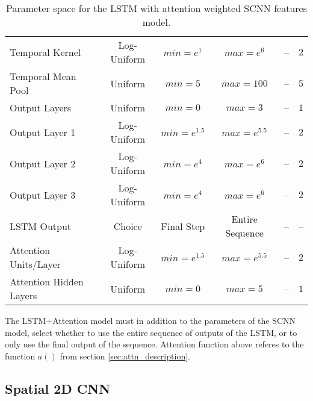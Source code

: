\begin{table}[htp]
{\begin{tabular}{ l | c | c | c | c | c }
      Temporal Kernel             &  Log-Uniform  & $min=e^{1}$   & $max=e^{6}$       &  --    & $2$         \\
      Temporal Mean Pool          &    Uniform    & $min=5$      & $max=100$         &  --    & $5$         \\
      Output Layers               &    Uniform    & $min=0$      & $max=3$           &  --    & $1$         \\
      Output Layer 1              &  Log-Uniform  & $min=e^{1.5}$ & $max=e^{5.5}$      &  --    & $2$         \\
      Output Layer 2              &  Log-Uniform  & $min=e^{4}$   & $max=e^{6}$       &  --    & $2$         \\
      Output Layer 3              &  Log-Uniform  & $min=e^{4}$   & $max=e^{6}$       &  --    & $2$         \\
      LSTM Output                 &    Choice     &  Final Step & Entire Sequence & -- & -- \\
      Attention Units/Layer       &  Log-Uniform  & $min=e^{1.5}$ & $max=e^{5.5}$      &  --    & $2$         \\
      Attention Hidden Layers            &    Uniform    & $min=0$      & $max=5$           & -- & $1$             \\
    \hline
  \end{tabular}}
  \caption{Parameter space for the LSTM with attention weighted SCNN features model.}
\end{table}

The LSTM+Attention model must in addition to the parameters of the SCNN model, select whether to use the entire sequence of outputs of the LSTM, or to only use the final output of the sequence. Attention function above referes to the function $a()$ from section \ref{sec:attn_description}.

\subsection{Spatial 2D CNN}

